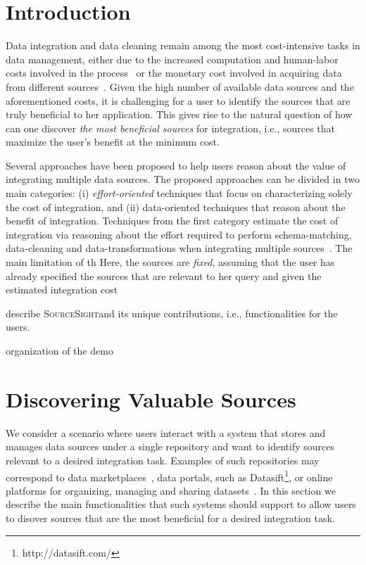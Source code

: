 \documentclass{vldb}
\newcommand\system{\textsc{SourceSight}}
\begin{document}
\section{Introduction}
Data integration and data cleaning remain among the most cost-intensive tasks in data management, either due to the increased computation and human-labor costs involved in the process~\cite{kruse2015estimating} or the monetary cost involved in acquiring data from different sources~\cite{balazinska:vldb11}. Given the high number of available data sources and the aforementioned costs, it is challenging for a user to identify the sources that are truly beneficial to her application. This gives rise to the natural question of how can one discover {\em the most beneficial sources} for integration, i.e., sources that maximize the user's benefit at the minimum cost. 

Several approaches have been proposed to help users reason about the value of integrating multiple data sources. The proposed approaches can be divided in two main categories: (i) {\em effort-oriented} techniques that focus on characterizing solely the cost of integration, and (ii) data-oriented techniques that reason about the benefit of integration. Techniques from the first category estimate the cost of integration via reasoning about the effort required to perform schema-matching, data-cleaning and data-transformations when integrating multiple sources~\cite{kruse2015estimating, smith:2009}. The main limitation of th Here, the sources are {\em fixed}, assuming that the user has already specified the sources that are relevant to her query and given the estimated integration cost 

describe \system and its unique contributions, i.e., functionalities for the users.

organization of the demo

\section{Discovering Valuable Sources}
  We consider a scenario where users interact with a system that stores and manages data sources under a single repository and want to identify sources relevant to a desired integration task. Examples of such repositories may correspond to data marketplaces~\cite{balazinska:vldb11}, data portals, such as Datasift\footnote{http://datasift.com/}, or online platforms for organizing, managing and sharing datasets~\cite{datahub}. In this section we describe the main functionalities that such systems should support to allow users to disover sources that are the most beneficial for a desired integration task. 
\end{document}
